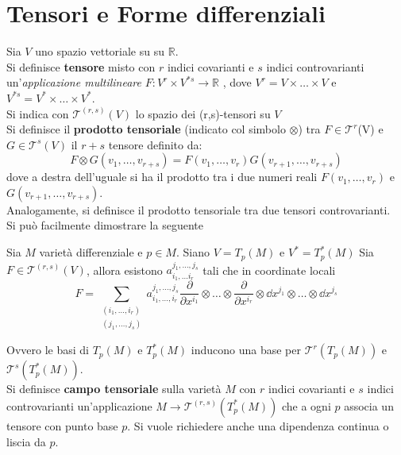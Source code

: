 \section{Tensori e Forme differenziali}
Sia $V$ uno spazio vettoriale su su $\mathbb{R}$.\\
Si definisce \textbf{tensore} misto con $r$ indici covarianti e $s$ indici
controvarianti un'\emph{applicazione multilineare} $F : V^r \times V^{*s} \to
\mathbb{R}$ , dove $V^r = V \times \dots \times V$ e
$V^{*s} =  V^* \times \dots \times V^*$.\\

Si indica con $\mathcal{T}^{(r,s)}(V)$ lo spazio dei (r,s)-tensori su $V$\\

Si definisce il \textbf{prodotto tensoriale} (indicato col simbolo $\otimes$) tra
$F \in \mathcal{T}^r$(V) e $G \in \mathcal{T}^s(V)$ il $r+s$ tensore definito da:
$$ F \otimes G (v_1,\dots,v_{r+s}) = F(v_1,\dots,v_r)G(v_{r+1},\dots,v_{r+s})$$
dove a destra dell'uguale si ha il prodotto tra i due numeri reali
$F(v_1,\dots,v_r)$ e $G(v_{r+1},\dots,v_{r+s})$.\\
Analogamente, si definisce il prodotto tensoriale tra due tensori controvarianti.\\

Si può facilmente dimostrare la seguente
\begin{proposition}\label{prop:base1}
   Sia $M$ varietà differenziale e $p \in M$. Siano $V = T_p(M)$ e $V^* = T_p^*(M)$
   Sia $F \in \mathcal{T}^{(r,s)}(V)$, allora esistono $a_{i_1,\dots i_r}^{j_1,\dots,j_s}$
   tali che in coordinate locali\\
   $$
      F = \sum_{\substack{(i_1,\dots, i_r)\\(j_1,\dots,j_s)}}
         a_{i_1,\dots, i_r}^{j_1,\dots,j_s}
         \frac{\partial}{\partial x^{i_1}} \otimes \dots
         \otimes \frac{\partial}{\partial x^{i_r}}
         \otimes \dd x^{j_1} \otimes \dots \otimes \dd x^{j_s}
   $$
\end{proposition}
Ovvero le basi di $T_p(M)$ e $T_p^*(M)$ inducono una base per $\mathcal{T}^r(T_p(M))$
e $\mathcal{T}^s(T_p^*(M))$.\\

Si definisce \textbf{campo tensoriale} sulla varietà $M$ con $r$ indici covarianti
e $s$ indici controvarianti un'applicazione $ M \to \mathcal{T}^{(r,s)}(T_p^*(M)) $
che a ogni $p$ associa un tensore con punto base $p$. Si vuole richiedere anche
una dipendenza continua o liscia da $p$.\\

